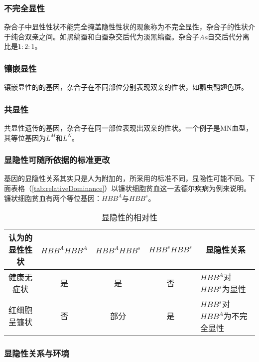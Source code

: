 \subsubsection{不完全显性}

杂合子中显性性状不能完全掩盖隐性性状的现象称为不完全显性，杂合子的性状介于纯合双亲之间。如黑缟蚕和白蚕杂交后代为淡黑缟蚕。杂合子\textit{Aa}自交后代分离比是$1:2:1$。

\subsubsection{镶嵌显性}

镶嵌显性的的基因，杂合子在不同部位分别表现双亲的性状，如瓢虫鞘翅色斑。
\subsubsection{共显性}

共显性遗传的基因，杂合子在同一部位表现出双亲的性状。一个例子是MN血型，其等位基因为$L^{M}$和$L^{N}$。

\subsubsection{显隐性可随所依据的标准更改}

基因的显隐性关系其实只是人为附加的，所采用的标准不同，显隐性可能不同。下面表格（\autoref{tab:relativeDominance}）以镰状细胞贫血这一孟德尔疾病为例来说明。镰状细胞贫血有两个等位基因：$HBB^{A}$与$HBB^{s}$。
\begin{table}[h!]
	\centering
	\begin{tabularx}{\textwidth}{|c|c|c|c|X|}
		\hline
		认为的显性性状 & $HBB^{A}HBB^{A}$ & $HBB^{A}HBB^{s}$ & $HBB^{s}HBB^{s}$ & \multicolumn{1}{c|}{显隐性关系} \\ \hline
		健康无症状   & 是                & 是                & 否                & $HBB^{A}$对$HBB^{s}$为显性     \\ \hline
		红细胞呈镰状  & 否                & 部分               & 是                & $HBB^{s}$对$HBB^{A}$为不完全显性  \\ \hline
	\end{tabularx}
	\caption{显隐性的相对性}
	\label{tab:relativeDominance}
\end{table}

\subsubsection{显隐性关系与环境}


